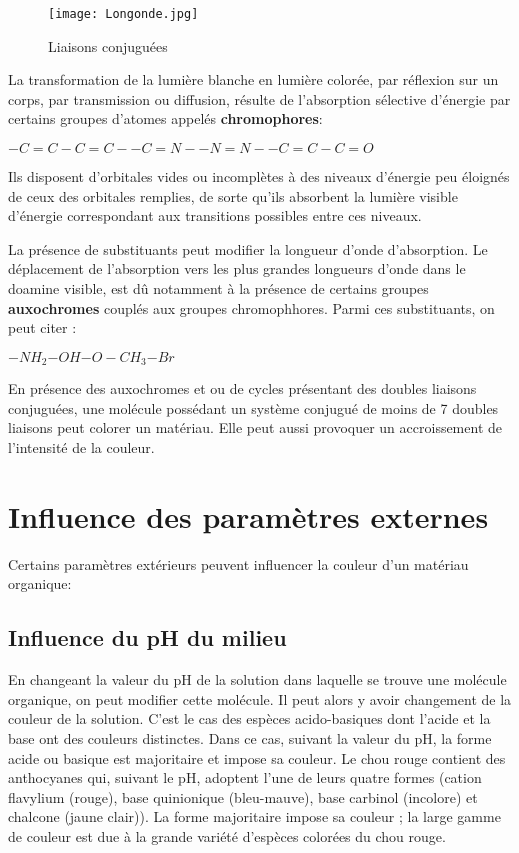\documentclass{article}
\begin{document}
\begin{figure}
    \centering
    \texttt{[image: Longonde.jpg]}
    \caption{Liaisons conjuguées}
    \label{fig:my_label}
\end{figure}

La transformation de la lumière blanche en lumière colorée, par réflexion sur un corps, par transmission ou diffusion, résulte de l'absorption sélective d'énergie par certains groupes d'atomes appelés \textbf{chromophores}:\medskip

$-C=C-C=C-$\qquad $-C=N-$\qquad $-N=N-$\qquad $-C=C-C=O$
\medskip

Ils disposent d'orbitales vides ou incomplètes à des niveaux d'énergie peu éloignés de ceux des orbitales remplies, de sorte qu'ils absorbent la lumière visible d'énergie correspondant aux transitions possibles entre ces niveaux.\medskip

La présence de substituants peut modifier la longueur d'onde d'absorption. Le déplacement de l'absorption vers les plus grandes longueurs d'onde dans le doamine visible, est dû notamment à la présence de certains groupes \textbf{auxochromes} couplés aux groupes chromophhores. Parmi ces substituants, on peut citer : \medskip

$-NH_2$\qquad $-OH$\qquad $-O-CH_3$\qquad $-Br$
\medskip

En présence des auxochromes et ou de cycles présentant des doubles liaisons conjuguées, une molécule possédant un système conjugué de moins de 7 doubles liaisons peut colorer un matériau. Elle peut aussi provoquer un accroissement de l'intensité de la couleur.

\section{Influence des paramètres externes}

Certains paramètres extérieurs peuvent influencer la couleur d'un matériau organique:

\subsection{Influence du pH du milieu}
En changeant la valeur du pH de la solution dans laquelle se trouve une molécule organique, on peut modifier cette molécule. Il peut alors y avoir changement de la couleur de la solution. C'est le cas des espèces acido-basiques dont l'acide et la base ont des couleurs distinctes. Dans ce cas, suivant la valeur du pH, la forme acide ou basique est majoritaire et impose sa couleur. Le chou rouge contient des anthocyanes qui, suivant le pH, adoptent l’une de leurs quatre formes (cation flavylium (rouge), base quinionique (bleu-mauve), base carbinol (incolore) et chalcone (jaune clair)). La forme majoritaire impose sa couleur ; la large gamme de couleur est due à la grande variété d’espèces
colorées du chou rouge.\medskip
\end{document}
